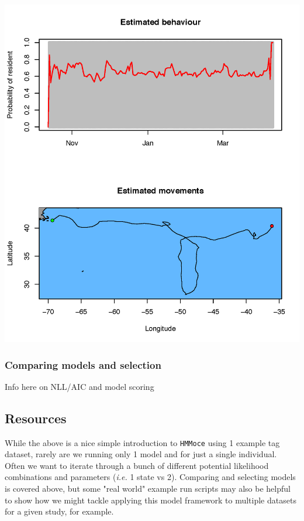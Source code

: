 \documentclass{article}\usepackage[]{graphicx}\usepackage[]{color}
\newcommand{\ie}{\textit{i.e.} }
\begin{document}
\includegraphics{./figure/141259_example_track_results.png}





\subsubsection{Comparing models and selection}

Info here on NLL/AIC and model scoring


\subsection{Resources}

While the above is a nice simple introduction to \texttt{HMMoce} using 1 example tag dataset, rarely are we running only 1 model and for just a single individual. Often we want to iterate through a bunch of different potential likelihood combinations and parameters (\ie 1 state vs 2). Comparing and selecting models is covered above, but some "real world" example run scripts may also be helpful to show how we might tackle applying this model framework to multiple datasets for a given study, for example.
\end{document}
